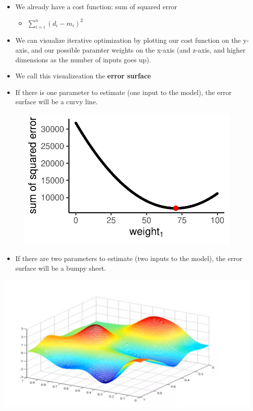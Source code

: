 \documentclass[
  letterpaper,
  DIV=11,
  numbers=noendperiod]{scrartcl}
\providecommand{\tightlist}{%
  \setlength{\itemsep}{0pt}\setlength{\parskip}{0pt}}\usepackage{longtable,booktabs,array}
\begin{document}
\begin{itemize}
\tightlist
\item
  We already have a cost function: sum of squared error

  \begin{itemize}
  \tightlist
  \item
    \(\sum_{i=i}^{n} (d_{i} - m_{i})^2\)
  \end{itemize}
\item
  We can visualize iterative optimization by plotting our cost function
  on the y-axis, and our possible paramter weights on the x-axis (and
  z-axis, and higher dimensions as the number of inputs goes up).
\item
  We call this visualizeation the \textbf{error surface}
\item
  If there is one parameter to estimate (one input to the model), the
  error surface will be a curvy line.
\end{itemize}

\begin{figure}

\begin{minipage}{0.50\linewidth}
\includegraphics{model-fitting_files/figure-pdf/unnamed-chunk-5-1.pdf}\end{minipage}%

\end{figure}%

\begin{itemize}
\tightlist
\item
  If there are two parameters to estimate (two inputs to the model), the
  error surface will be a bumpy sheet.
\end{itemize}

\includegraphics{../assests/images/error-surface.png}
\end{document}

